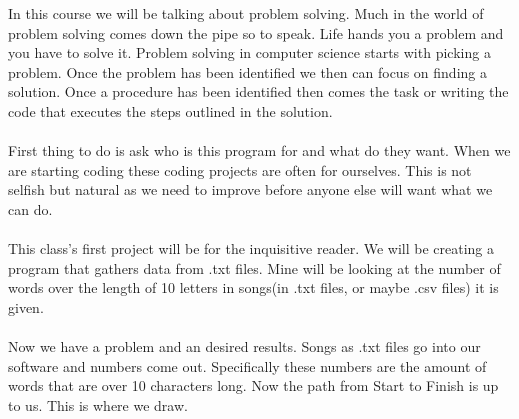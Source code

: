 \documentclass[..main.tex]{subfiles}
\begin{document}
In this course we will be talking about problem solving. Much in the world of problem solving comes down the pipe so to speak. Life hands you a problem and you have to solve it. Problem solving in computer science starts with picking a problem. Once the problem has been identified we then can focus on finding a solution. Once a procedure has been identified then comes the task or writing the code that executes the steps outlined in the solution. \\
\\
First thing to do is ask who is this program for and what do they want. When we are starting coding these coding projects are often for ourselves. This is not selfish but natural as we need to improve before anyone else will want what we can do. \\
\\
This class's first project will be for the inquisitive reader. We will be creating a program that gathers data from .txt files. Mine will be looking at the number of words over the length of 10 letters in songs(in .txt files, or maybe .csv files) it is given. \\
\\
Now we have a problem and an desired results. Songs as .txt files go into our software and numbers come out. Specifically these numbers are the amount of words that are over 10 characters long. Now the path from Start to Finish is up to us. This is where we draw. \\
\\
\begin{center}
\end{center}
\\
\end{document}
